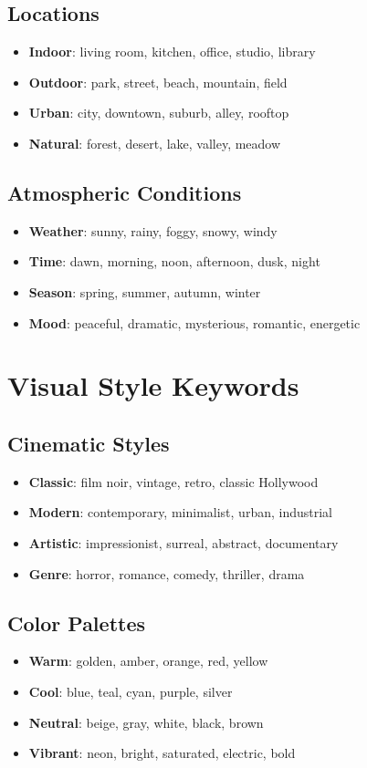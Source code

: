 \subsection{Locations}
\begin{itemize}
\item \textbf{Indoor}: living room, kitchen, office, studio, library
\item \textbf{Outdoor}: park, street, beach, mountain, field
\item \textbf{Urban}: city, downtown, suburb, alley, rooftop
\item \textbf{Natural}: forest, desert, lake, valley, meadow
\end{itemize}

\subsection{Atmospheric Conditions}
\begin{itemize}
\item \textbf{Weather}: sunny, rainy, foggy, snowy, windy
\item \textbf{Time}: dawn, morning, noon, afternoon, dusk, night
\item \textbf{Season}: spring, summer, autumn, winter
\item \textbf{Mood}: peaceful, dramatic, mysterious, romantic, energetic
\end{itemize}

\section{Visual Style Keywords}

\subsection{Cinematic Styles}
\begin{itemize}
\item \textbf{Classic}: film noir, vintage, retro, classic Hollywood
\item \textbf{Modern}: contemporary, minimalist, urban, industrial
\item \textbf{Artistic}: impressionist, surreal, abstract, documentary
\item \textbf{Genre}: horror, romance, comedy, thriller, drama
\end{itemize}

\subsection{Color Palettes}
\begin{itemize}
\item \textbf{Warm}: golden, amber, orange, red, yellow
\item \textbf{Cool}: blue, teal, cyan, purple, silver
\item \textbf{Neutral}: beige, gray, white, black, brown
\item \textbf{Vibrant}: neon, bright, saturated, electric, bold
\end{itemize}

